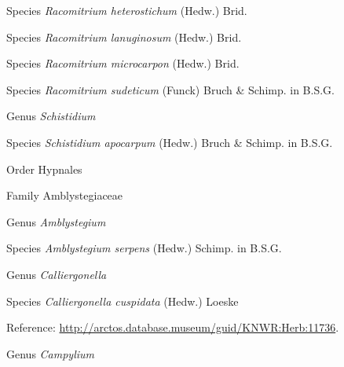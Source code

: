 \documentclass[9pt, article]{memoir}
\begin{document}
\begin{multicols}{2}
\vspace{6pt}\noindent\hspace{36pt}Species \textit{Racomitrium heterostichum} (Hedw.) Brid.


\vspace{6pt}\noindent\hspace{36pt}Species \textit{Racomitrium lanuginosum} (Hedw.) Brid.


\vspace{6pt}\noindent\hspace{36pt}Species \textit{Racomitrium microcarpon} (Hedw.) Brid.


\vspace{6pt}\noindent\hspace{36pt}Species \textit{Racomitrium sudeticum} (Funck) Bruch \& Schimp. in B.S.G.


\vspace{6pt}\noindent\hspace{30pt}Genus \textit{Schistidium}


\vspace{6pt}\noindent\hspace{36pt}Species \textit{Schistidium apocarpum} (Hedw.) Bruch \& Schimp. in B.S.G.


\vspace{6pt}\noindent\hspace{18pt}Order Hypnales


\vspace{6pt}\noindent\hspace{24pt}Family Amblystegiaceae


\vspace{6pt}\noindent\hspace{30pt}Genus \textit{Amblystegium}


\vspace{6pt}\noindent\hspace{36pt}Species \textit{Amblystegium serpens} (Hedw.) Schimp. in B.S.G.


\vspace{6pt}\noindent\hspace{30pt}Genus \textit{Calliergonella}


\vspace{6pt}\noindent\hspace{36pt}Species \textit{Calliergonella cuspidata} (Hedw.) Loeske


\vspace{6pt}Reference: 
\url{http://arctos.database.museum/guid/KNWR:Herb:11736}.

\vspace{6pt}\noindent\hspace{30pt}Genus \textit{Campylium}



\end{multicols}
\end{document}
